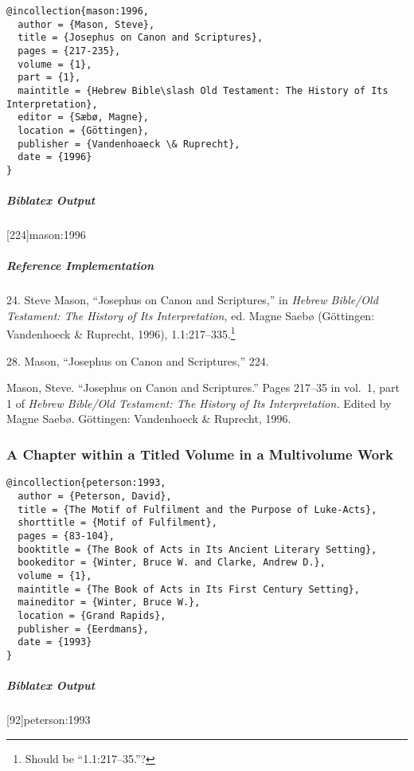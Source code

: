 \documentclass[a4paper]{article}
\newenvironment{biboutput}{%
  \subparagraph{Biblatex Output}
}{\color{black}}
\newenvironment{refimp}{%
  \subparagraph{Reference Implementation}
  \color{reference-colour}
  \rm
}{\par\color{black}}
\begin{document}
\begin{lstlisting}
@incollection{mason:1996,
  author = {Mason, Steve},
  title = {Josephus on Canon and Scriptures},
  pages = {217-235},
  volume = {1},
  part = {1},
  maintitle = {Hebrew Bible\slash Old Testament: The History of Its Interpretation},
  editor = {Sæbø, Magne},
  location = {Göttingen},
  publisher = {Vandenhoaeck \& Ruprecht},
  date = {1996}
}
\end{lstlisting}

\begin{biboutput}
  [224]{mason:1996}
\end{biboutput}

\begin{refimp}
  24. Steve Mason, “Josephus on Canon and Scriptures,” in \emph{Hebrew
  Bible\slash Old Testament: The History of Its Interpretation,} ed. Magne
  Saebø (Göttingen: Vandenhoeck \& Ruprecht, 1996),
  1.1:217–335.\footnote{Should be “1.1:217–35.”?}

  28. Mason, “Josephus on Canon and Scriptures,” 224.

  \hangindent\bibindent Mason, Steve. “Josephus on Canon and Scriptures.”
  Pages 217–35 in vol.~1, part 1 of \emph{Hebrew Bible\slash Old Testament:
  The History of Its Interpretation.} Edited by Magne Saebø. Göttingen:
  Vandenhoeck \& Ruprecht, 1996.
\end{refimp}

\subsubsection{A Chapter within a Titled Volume in a Multivolume Work}

\begin{lstlisting}
@incollection{peterson:1993,
  author = {Peterson, David},
  title = {The Motif of Fulfilment and the Purpose of Luke-Acts},
  shorttitle = {Motif of Fulfilment},
  pages = {83-104},
  booktitle = {The Book of Acts in Its Ancient Literary Setting},
  bookeditor = {Winter, Bruce W. and Clarke, Andrew D.},
  volume = {1},
  maintitle = {The Book of Acts in Its First Century Setting},
  maineditor = {Winter, Bruce W.},
  location = {Grand Rapids},
  publisher = {Eerdmans},
  date = {1993}
}
\end{lstlisting}  

\begin{biboutput}
  [92]{peterson:1993}
\end{biboutput}
\end{document}
